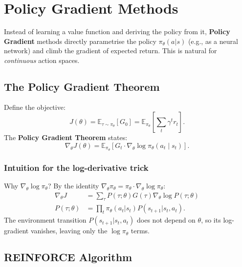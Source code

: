 \documentclass[12pt,a4paper]{article}
\begin{document}
\section{Policy Gradient Methods}

\begin{insbox}
Instead of learning a value function and deriving the policy from it,
\textbf{Policy Gradient} methods directly parametrise the policy
$\pi_\theta(a|s)$ (e.g., as a neural network) and climb the gradient of
expected return.  This is natural for \emph{continuous} action spaces.
\end{insbox}

\subsection{The Policy Gradient Theorem}

Define the objective:
\begin{equation}
  J(\theta) = \mathbb{E}_{\tau \sim \pi_\theta}\!\left[G_0\right]
  = \mathbb{E}_{\pi_\theta}\!\left[\sum_t \gamma^t r_t\right].
\end{equation}
The \textbf{Policy Gradient Theorem} states:
\begin{equation}
  \nabla_\theta J(\theta)
  = \mathbb{E}_{\pi_\theta}\!\left[
    G_t \cdot \nabla_\theta \log \pi_\theta(a_t \mid s_t)
  \right].
  \label{eq:pg_theorem}
\end{equation}

\subsubsection*{Intuition for the log-derivative trick}

Why $\nabla_\theta \log \pi_\theta$?  By the identity
$\nabla_\theta \pi_\theta = \pi_\theta \cdot \nabla_\theta \log \pi_\theta$:
\begin{align*}
  \nabla_\theta J &= \sum_\tau P(\tau;\theta) G(\tau) \nabla_\theta \log P(\tau;\theta) \\
  P(\tau;\theta) &= \prod_t \pi_\theta(a_t|s_t) P(s_{t+1}|s_t,a_t).
\end{align*}
The environment transition $P(s_{t+1}|s_t,a_t)$ does not depend on $\theta$,
so its log-gradient vanishes, leaving only the $\log \pi_\theta$ terms.

\subsection{REINFORCE Algorithm}
\end{document}
